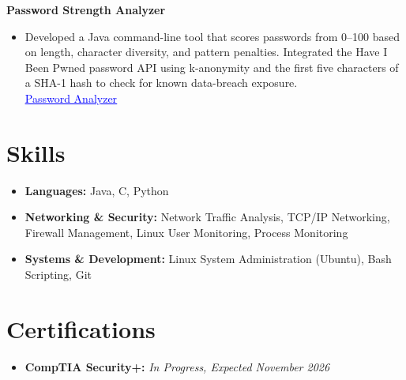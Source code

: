\documentclass[12pt,letterpaper]{article}
\newcommand{\resumeItem}[1]{\item\small{#1}}
\newcommand{\projectHeading}[2]{\textbf{#1} \hfill \textit{#2}}
\begin{document}
\vspace{4pt}
\noindent
\projectHeading{Password Strength Analyzer}{}
\begin{itemize}[leftmargin=1.2em,itemsep=1pt,topsep=2pt]
  \resumeItem{Developed a Java command-line tool that scores passwords from 0--100 based on length, character diversity, and pattern penalties. Integrated the Have I Been Pwned password API using k-anonymity and the first five characters of a SHA-1 hash to check for known data-breach exposure.\\}
  \href{https://github.com/alecrosenberg/Password-Strength-Analyzer}{\textcolor{blue}{\underline{Password Analyzer}}}
\end{itemize}

\section{Skills}
\begin{itemize}[leftmargin=1.2em,itemsep=1pt,topsep=2pt]
  \resumeItem{\textbf{Languages:} Java, C, Python}
  \resumeItem{\textbf{Networking \& Security:} Network Traffic Analysis, TCP/IP Networking, Firewall Management, Linux User Monitoring, Process Monitoring}
  \resumeItem{\textbf{Systems \& Development:} Linux System Administration (Ubuntu), Bash Scripting, Git}
\end{itemize}

\section{Certifications}
\begin{itemize}[leftmargin=1.2em,itemsep=1pt,topsep=2pt]
  \resumeItem{\textbf{CompTIA Security+:} \textit{In Progress, Expected November 2026}}
\end{itemize}
\end{document}
